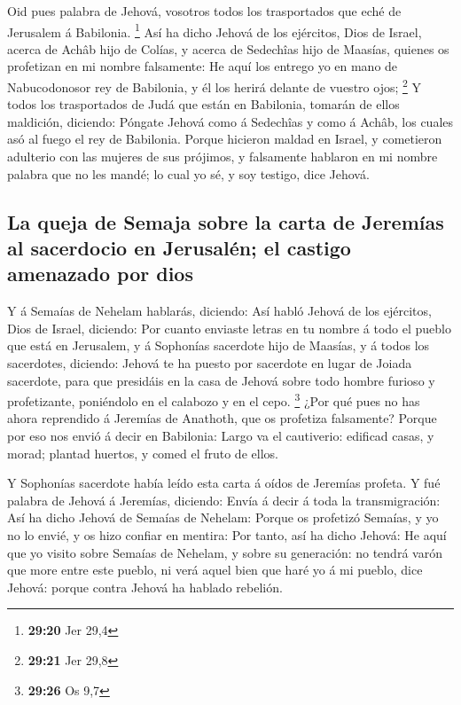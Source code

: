  Oid pues palabra de Jehová, vosotros todos los
trasportados que eché de Jerusalem á Babilonia. \footnote{\textbf{29:20}
  Jer 29,4}  Así ha dicho Jehová de los ejércitos, Dios
de Israel, acerca de Achâb hijo de Colías, y acerca de Sedechîas hijo de
Maasías, quienes os profetizan en mi nombre falsamente: He aquí los
entrego yo en mano de Nabucodonosor rey de Babilonia, y él los herirá
delante de vuestro ojos; \footnote{\textbf{29:21} Jer 29,8}
 Y todos los trasportados de Judá que están en Babilonia,
tomarán de ellos maldición, diciendo: Póngate Jehová como á Sedechîas y
como á Achâb, los cuales asó al fuego el rey de Babilonia.
 Porque hicieron maldad en Israel, y cometieron adulterio
con las mujeres de sus prójimos, y falsamente hablaron en mi nombre
palabra que no les mandé; lo cual yo sé, y soy testigo, dice Jehová.

\hypertarget{la-queja-de-semaja-sobre-la-carta-de-jeremuxedas-al-sacerdocio-en-jerusaluxe9n-el-castigo-amenazado-por-dios}{%
\subsection{La queja de Semaja sobre la carta de Jeremías al sacerdocio
en Jerusalén; el castigo amenazado por
dios}\label{la-queja-de-semaja-sobre-la-carta-de-jeremuxedas-al-sacerdocio-en-jerusaluxe9n-el-castigo-amenazado-por-dios}}

 Y á Semaías de Nehelam hablarás, diciendo:
 Así habló Jehová de los ejércitos, Dios de Israel,
diciendo: Por cuanto enviaste letras en tu nombre á todo el pueblo que
está en Jerusalem, y á Sophonías sacerdote hijo de Maasías, y á todos
los sacerdotes, diciendo:  Jehová te ha puesto por
sacerdote en lugar de Joiada sacerdote, para que presidáis en la casa de
Jehová sobre todo hombre furioso y profetizante, poniéndolo en el
calabozo y en el cepo. \footnote{\textbf{29:26} Os 9,7} 
¿Por qué pues no has ahora reprendido á Jeremías de Anathoth, que os
profetiza falsamente?  Porque por eso nos envió á decir
en Babilonia: Largo va el cautiverio: edificad casas, y morad; plantad
huertos, y comed el fruto de ellos.

 Y Sophonías sacerdote había leído esta carta á oídos de
Jeremías profeta.  Y fué palabra de Jehová á Jeremías,
diciendo:  Envía á decir á toda la transmigración: Así ha
dicho Jehová de Semaías de Nehelam: Porque os profetizó Semaías, y yo no
lo envié, y os hizo confiar en mentira:  Por tanto, así
ha dicho Jehová: He aquí que yo visito sobre Semaías de Nehelam, y sobre
su generación: no tendrá varón que more entre este pueblo, ni verá aquel
bien que haré yo á mi pueblo, dice Jehová: porque contra Jehová ha
hablado rebelión.


